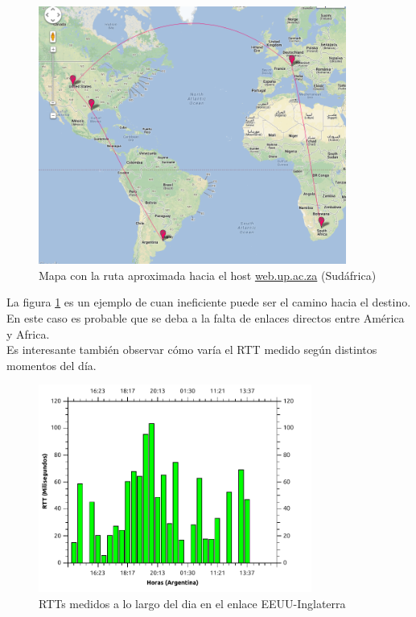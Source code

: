 \begin{figure}[H]
  \centering
    \includegraphics[width=0.9\textwidth]{imgs/sudafrica_ruta_1.png}
    \caption{Mapa con la ruta aproximada hacia el host \url{web.up.ac.za} (Sud\'africa)}
    \label{fig:ruta_sud}
\end{figure}

La figura \ref{fig:ruta_sud} es un ejemplo de cuan ineficiente puede ser el camino hacia el destino. En este caso es probable que se deba a la falta de enlaces directos entre América y Africa.\\

Es interesante tambi\'en observar c\'omo var\'ia el RTT medido seg\'un distintos momentos del d\'ia.

\begin{figure}[H]
  \centering
    \includegraphics[width=0.8\textwidth]{graficos/rtts_dia_finlandia.pdf}
    \caption{RTTs medidos a lo largo del dia en el enlace EEUU-Inglaterra}
    \label{fig:rtts_fin}
\end{figure}

